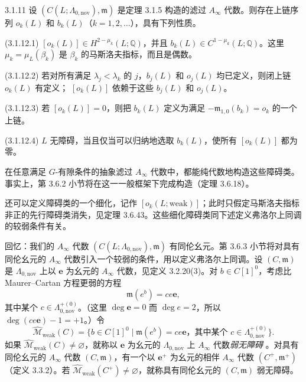\begin{theorem}{3.1.11}\label{thm:3-1-11}
设 $(C(L;\Lambda_{0,\mathrm{nov}}),\mathfrak m)$ 是定理 3.1.5 构造的滤过
$A_\infty$ 代数。则存在上链序列 $o_k(L)$ 和 $b_k(L)$（$k=1,2,\ldots$），具有下列性质。

\smallskip
\noindent\textup{(3.1.12.1)}
$[o_k(L)]\in H^{2-\mu_k}(L;\mathbb Q)$，并且
$b_k(L)\in C^{1-\mu_k}(L;\mathbb Q)$。这里
$\mu_k=\mu_L(\beta_k)$ 是 $\beta_k$ 的马斯洛夫指标，而且是偶数。

\noindent\textup{(3.1.12.2)}
若对所有满足 $\lambda_j<\lambda_k$ 的 $j$，$b_j(L)$ 和
$o_j(L)$ 均已定义，则闭上链 $o_k(L)$ 有定义；
$[o_k(L)]$ 依赖于这些 $b_j(L)$ 和 $o_j(L)$。

\noindent\textup{(3.1.12.3)}
若 $[o_k(L)]=0$，则把 $b_k(L)$ 定义为满足
$-\mathfrak m_{1,0}(b_k)=o_k$ 的一个上链。

\noindent\textup{(3.1.12.4)}
$L$ 无障碍，当且仅当可以归纳地选取 $b_k(L)$，使所有
$[o_k(L)]$ 都为零。
\end{theorem}

在任意满足 $G$-有隙条件的抽象滤过 $A_\infty$ 代数中，都能纯代数地构造这些障碍类。事实上，第 3.6.2 小节将在这一一般框架下完成构造（定理 3.6.18）。

还可以定义障碍类的一个细化，记作 $[o_k(L;\mathrm{weak})]$；此时只假定马斯洛夫指标非正的先行障碍类消失，见定理 3.6.43。这些细化障碍类同下述定义弗洛尔上同调的较弱条件有关。

回忆：我们的 $A_\infty$ 代数
$(C(L;\Lambda_{0,\mathrm{nov}}),\mathfrak m)$ 有同伦幺元。第 3.6.3 小节将对具有同伦幺元的 $A_\infty$ 代数引入一个较弱的条件，用以定义弗洛尔上同调。设
$(C,\mathfrak m)$ 是 $\Lambda_{0,\mathrm{nov}}$ 上以 $\mathbf e$ 为幺元的
$A_\infty$ 代数，见定义 3.2.20(3)。对 $b\in C[1]^0$，考虑比
Maurer--Cartan 方程更弱的方程
\begin{equation}
  \mathfrak m(e^b)=ce\mathbf e,
  \tag{3.1.13}\label{eq:3-1-13}
\end{equation}
其中某个 $c\in\Lambda_{0,\mathrm{nov}}^{+(0)}$。（这里
$\deg\mathbf e=0$ 而 $\deg e=2$，所以
$\deg(ce\mathbf e)-1=+1$。）令
\[
  \widehat{\mathcal M}_{\mathrm{weak}}(C)
  =\bigl\{b\in C[1]^0\mid
  \mathfrak m(e^b)=ce\mathbf e
  \text{，其中某个 }c\in\Lambda_{0,\mathrm{nov}}^{+(0)}\bigr\}.
\]
如果 $\widehat{\mathcal M}_{\mathrm{weak}}(C)\neq\varnothing$，就称以
$\mathbf e$ 为幺元的 $\Lambda_{0,\mathrm{nov}}$ 上 $A_\infty$ 代数\emph{弱无障碍}
。对具有同伦幺元的 $A_\infty$ 代数
$(C,\mathfrak m)$，有一个以 $\mathbf e^+$ 为幺元的相伴
$A_\infty$ 代数 $(C^+,\mathfrak m^+)$（定义 3.3.2）。若
$\widehat{\mathcal M}_{\mathrm{weak}}(C^+)\neq\varnothing$，就称具有同伦幺元的
$(C,\mathfrak m)$ 弱无障碍。

